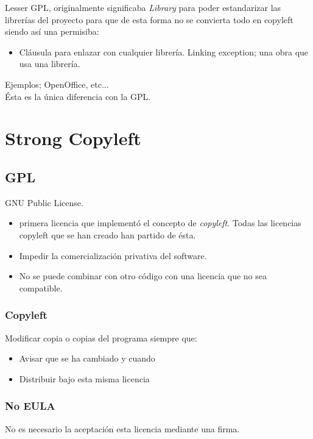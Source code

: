 \documentclass[11pt]{scrartcl}
\begin{document}
Lesser GPL, originalmente significaba \emph{Library} para poder estandarizar las librer\'ias del proyecto para que de esta forma no se convierta todo en copyleft siendo as\'i una permisiba:
\begin{itemize}

	\item Cl\'ausula para enlazar con cualquier librer\'ia. Linking exception; una obra que usa una librer\'ia.
\end{itemize}
Ejemplos; OpenOffice, etc...\\
\'Esta es la \'unica diferencia con la GPL.\\

\section{Strong Copyleft}

\subsection{GPL}

GNU Public License.
\begin{itemize}
	\item primera licencia que implement\'o el concepto de \emph{copyleft}. Todas las licencias copyleft que se han creado han partido de \'esta.
	\item Impedir la comercializaci\'on privativa del software.
	\item No se puede combinar con otro c\'odigo con una licencia que no sea compatible.
\end{itemize}

\subsubsection{Copyleft}

Modificar copia o copias del programa siempre que:
\begin{itemize}
	\item Avisar que se ha cambiado y cuando
	\item Distribuir bajo esta misma licencia
\end{itemize}

\subsubsection{No EULA}

No es necesario la aceptaci\'on esta licencia mediante una firma.
\end{document}
